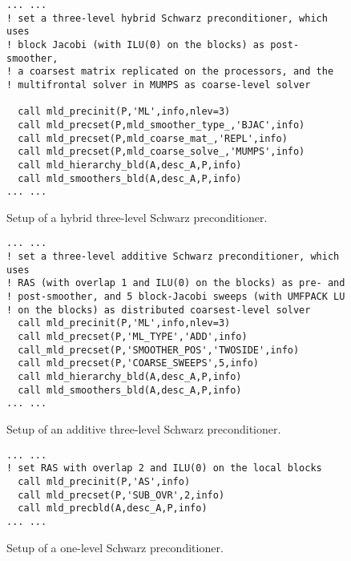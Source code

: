 \begin{figure}[tbh]
\begin{center}
\begin{minipage}{.90\textwidth} 
{\small
\begin{verbatim}
... ...
! set a three-level hybrid Schwarz preconditioner, which uses
! block Jacobi (with ILU(0) on the blocks) as post-smoother,
! a coarsest matrix replicated on the processors, and the
! multifrontal solver in MUMPS as coarse-level solver

  call mld_precinit(P,'ML',info,nlev=3)
  call mld_precset(P,mld_smoother_type_,'BJAC',info)
  call mld_precset(P,mld_coarse_mat_,'REPL',info)
  call mld_precset(P,mld_coarse_solve_,'MUMPS',info)
  call mld_hierarchy_bld(A,desc_A,P,info)
  call mld_smoothers_bld(A,desc_A,P,info)
... ...
\end{verbatim}
}
\end{minipage}

\caption{Setup of a hybrid three-level Schwarz preconditioner.\label{fig:ex_3lhm}}
\end{center}
\end{figure}


\begin{figure}[tbh]
\begin{center}
\begin{minipage}{.90\textwidth} 
{\small
\begin{verbatim}
... ...
! set a three-level additive Schwarz preconditioner, which uses 
! RAS (with overlap 1 and ILU(0) on the blocks) as pre- and 
! post-smoother, and 5 block-Jacobi sweeps (with UMFPACK LU
! on the blocks) as distributed coarsest-level solver
  call mld_precinit(P,'ML',info,nlev=3)
  call mld_precset(P,'ML_TYPE','ADD',info)
  call_mld_precset(P,'SMOOTHER_POS','TWOSIDE',info)
  call mld_precset(P,'COARSE_SWEEPS',5,info)
  call mld_hierarchy_bld(A,desc_A,P,info)
  call mld_smoothers_bld(A,desc_A,P,info)
... ...
\end{verbatim}
}
\end{minipage}

\caption{Setup of an additive three-level Schwarz preconditioner.\label{fig:ex_3la}}
\end{center}
\end{figure}

\begin{figure}[tbh]
\begin{center}
\begin{minipage}{.90\textwidth} 
{\small
\begin{verbatim}
... ...
! set RAS with overlap 2 and ILU(0) on the local blocks
  call mld_precinit(P,'AS',info)
  call mld_precset(P,'SUB_OVR',2,info)
  call mld_precbld(A,desc_A,P,info)
... ...
\end{verbatim}
}
\end{minipage}
\caption{Setup of a one-level Schwarz preconditioner.\label{fig:ex_1l}}
\end{center}
\end{figure}


